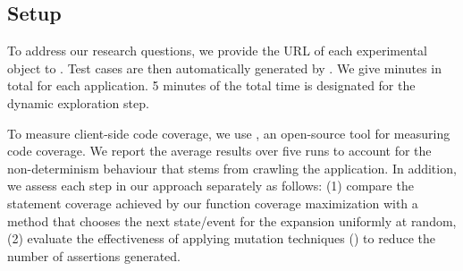 \subsection{Setup} \label{Sec:setup}
To address our research questions, we provide the URL of each  experimental object to \tool.
Test cases are then automatically generated by \tool.
We give  minutes in total for each application. 
5 minutes of the total time is designated for the dynamic exploration step.

%
 \label{test-gen-setup}
To measure client-side code coverage, we use \jscover \cite{jscover}, an open-source tool for measuring \javascript code coverage. We report the average results over five runs to account for the non-determinism behaviour that stems from crawling the application.
In addition,  we assess each step in our approach separately as follows: 
(1) compare the statement coverage achieved by our function coverage maximization with a method that chooses the next state/event for the expansion uniformly at random, 
(2) evaluate the effectiveness of applying mutation techniques () to reduce the number of assertions generated.

